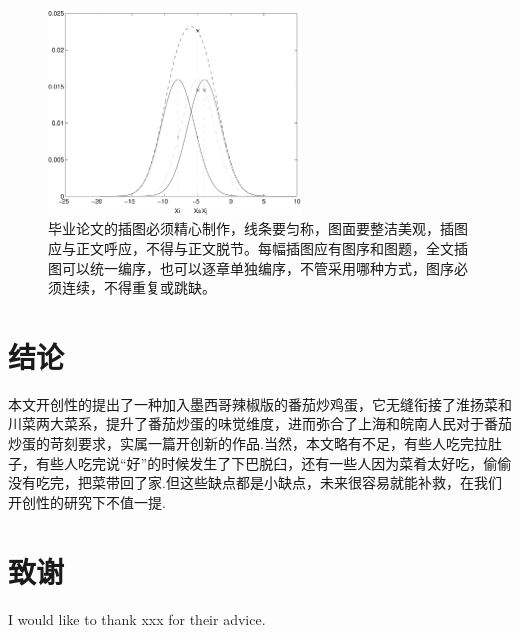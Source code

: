 \begin{figure}[htb]
    \centering
    \includegraphics[width=0.6\textwidth]{figures/example.pdf}
    \caption{毕业论文的插图必须精心制作，线条要匀称，图面要整洁美观，插图应与正文呼应，不得与正文脱节。每幅插图应有图序和图题，全文插图可以统一编序，也可以逐章单独编序，不管采用哪种方式，图序必须连续，不得重复或跳缺。}
    \label{fig:1}
\end{figure}




\newpage
\section{结论}
本文开创性的提出了一种加入墨西哥辣椒版的番茄炒鸡蛋，它无缝衔接了淮扬菜和川菜两大菜系，提升了番茄炒蛋的味觉维度，进而弥合了上海和皖南人民对于番茄炒蛋的苛刻要求，实属一篇开创新的作品.当然，本文略有不足，有些人吃完拉肚子，有些人吃完说“好”的时候发生了下巴脱臼，还有一些人因为菜肴太好吃，偷偷没有吃完，把菜带回了家.但这些缺点都是小缺点，未来很容易就能补救，在我们开创性的研究下不值一提.




\newpage




\newpage
\section*{致谢}
I would like to thank xxx for their advice.






